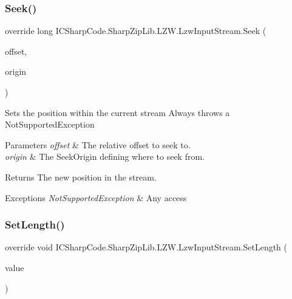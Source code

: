 \subsubsection{\texorpdfstring{Seek()}{Seek()}}
{\footnotesize\ttfamily override long I\+C\+Sharp\+Code.\+Sharp\+Zip\+Lib.\+L\+Z\+W.\+Lzw\+Input\+Stream.\+Seek (\begin{DoxyParamCaption}\item[{long}]{offset,  }\item[{Seek\+Origin}]{origin }\end{DoxyParamCaption})\hspace{0.3cm}{\ttfamily [inline]}}



Sets the position within the current stream Always throws a Not\+Supported\+Exception 


\begin{DoxyParams}{Parameters}
{\em offset} & The relative offset to seek to.\\
\hline
{\em origin} & The Seek\+Origin defining where to seek from.\\
\hline
\end{DoxyParams}
\begin{DoxyReturn}{Returns}
The new position in the stream.
\end{DoxyReturn}

\begin{DoxyExceptions}{Exceptions}
{\em Not\+Supported\+Exception} & Any access\\
\hline
\end{DoxyExceptions}
\mbox{\label{class_i_c_sharp_code_1_1_sharp_zip_lib_1_1_l_z_w_1_1_lzw_input_stream_a7345d3b1fd3d5c702ecd1f4b0ba247e8}} 
\subsubsection{\texorpdfstring{Set\+Length()}{SetLength()}}
{\footnotesize\ttfamily override void I\+C\+Sharp\+Code.\+Sharp\+Zip\+Lib.\+L\+Z\+W.\+Lzw\+Input\+Stream.\+Set\+Length (\begin{DoxyParamCaption}\item[{long}]{value }\end{DoxyParamCaption})\hspace{0.3cm}{\ttfamily [inline]}}



